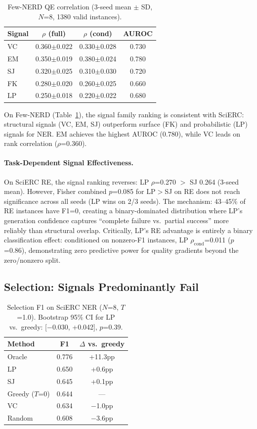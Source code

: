 \documentclass[11pt]{article}
\begin{document}
\begin{table}[t]
\centering
\small
\caption{Few-NERD QE correlation (3-seed mean $\pm$ SD, $N$=8, 1380 valid instances).}
\label{tab:qe_fewnerd}
\begin{tabular}{lccc}
\toprule
Signal & $\rho$ (full) & $\rho$ (cond) & AUROC \\
\midrule
VC & 0.360$\pm$0.022 & 0.330$\pm$0.028 & 0.730 \\
EM & 0.350$\pm$0.019 & 0.380$\pm$0.024 & 0.780 \\
SJ & 0.320$\pm$0.025 & 0.310$\pm$0.030 & 0.720 \\
FK & 0.280$\pm$0.020 & 0.260$\pm$0.025 & 0.660 \\
LP & 0.250$\pm$0.018 & 0.220$\pm$0.022 & 0.680 \\
\bottomrule
\end{tabular}
\end{table}

On Few-NERD (Table~\ref{tab:qe_fewnerd}), the signal family ranking is consistent with SciERC: structural signals (VC, EM, SJ) outperform surface (FK) and probabilistic (LP) signals for NER. EM achieves the highest AUROC (0.780), while VC leads on rank correlation ($\rho$=0.360).

\paragraph{Task-Dependent Signal Effectiveness.} On SciERC RE, the signal ranking reverses: LP $\rho$=0.270 $>$ SJ 0.264 (3-seed mean). However, Fisher combined $p$=0.085 for LP$>$SJ on RE does not reach significance across all seeds (LP wins on 2/3 seeds). The mechanism: 43--45\% of RE instances have F1=0, creating a binary-dominated distribution where LP's generation confidence captures ``complete failure vs.\ partial success'' more reliably than structural overlap. Critically, LP's RE advantage is entirely a binary classification effect: conditioned on nonzero-F1 instances, LP $\rho_{\text{cond}}$=0.011 ($p$=0.86), demonstrating zero predictive power for quality gradients beyond the zero/nonzero split.

\subsection{Selection: Signals Predominantly Fail}

\begin{table}[t]
\centering
\small
\caption{Selection F1 on SciERC NER ($N$=8, $T$=1.0). Bootstrap 95\% CI for LP vs.\ greedy: [$-$0.030, +0.042], $p$=0.39.}
\label{tab:selection_scierc}
\begin{tabular}{lcc}
\toprule
Method & F1 & $\Delta$ vs.\ greedy \\
\midrule
Oracle & 0.776 & +11.3pp \\
LP & 0.650 & +0.6pp \\
SJ & 0.645 & +0.1pp \\
Greedy ($T$=0) & 0.644 & --- \\
VC & 0.634 & $-$1.0pp \\
Random & 0.608 & $-$3.6pp \\
\bottomrule
\end{tabular}
\end{table}
\end{document}
